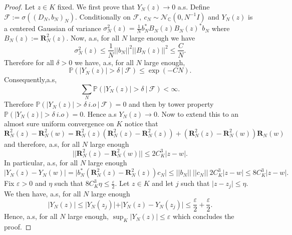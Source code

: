 \documentclass[12pt,a4paper]{amsart}
\theoremstyle{plain} %
\newcommand{\PP}{\mathbb{P}}
\newcommand{\C}{\mathbb{C}}
\begin{document}
\begin{proof}
     Let $z \in K$ fixed. We first prove that $Y_N(z)\rightarrow0$ a.s. Define $\mathcal{F}:=\sigma((D_N,b_N)_N)$. Conditionally on $\mathcal{F}, \ c_N \sim \mathcal{N}_{\C}(0,N^{-1}I)$ and $Y_N(z)$ is a centered Gaussian of variance $\sigma_N^2(z)=\frac{1}{N}b_N^*B_N(z)B_N(z)^*b_N$ where $B_N(z):=\mathbf{R}^2_{N}(z)$. Now, a.s, for all $N$ large enough we have 
     \begin{equation*}
         \sigma_N^2(z)\leq \frac{1}{N}\lvert \lvert b_N\lvert \lvert ^2 \lvert \lvert B_N(z)\lvert \lvert^2\leq \frac{C}{N}.
     \end{equation*}
     Therefore for all $\delta>0$ we have, a.s, for all $N$ large enough, 
     \begin{equation*}
         \PP(\lvert Y_N(z)\lvert> \delta \ \lvert \ \mathcal{F})\leq \exp(-CN). 
     \end{equation*}
     Consequently,a.s,
     \begin{equation*}
         \sum_N \PP(\lvert Y_N(z)\lvert> \delta \ \lvert \ \mathcal{F}) < \infty.
     \end{equation*}
     Therefore $\PP(\lvert Y_N(z)\lvert> \delta  \ \textit{i.o}\ \lvert \ \mathcal{F})=0$  and then by tower property $\PP(\lvert Y_N(z)\lvert> \delta  \ \textit{i.o})=0$. Hence a.s $Y_N(z)\rightarrow0$. Now to extend this to an almost sure uniform convergence on $K$ notice that 
     \begin{equation*}
         \mathbf{R}^2_{N}(z)-\mathbf{R}^2_{N}(w)=\mathbf{R}^2_{N}(z)(\mathbf{R}^2_{N}(z)-\mathbf{R}^2_{N}(z))+(\mathbf{R}^2_{N}(z)-\mathbf{R}^2_{N}(w))\mathbf{R}_{N}(w)
     \end{equation*}
     and therefore, a.s, for all $N$ large enough
     \begin{equation*}
         \lvert \lvert \mathbf{R}^2_{N}(z)-\mathbf{R}^2_{N}(w) \lvert \lvert \leq 2C_K^3\lvert z-w \lvert.
     \end{equation*}
     In particular, a.s, for all $N$ large enough
     \begin{equation*}
         \lvert Y_N(z) -Y_N(w)\lvert =\lvert b_N^*(\mathbf{R}^2_{N}(z)-\mathbf{R}^2_{N}(z))c_N\lvert \leq \lvert \lvert b_N\lvert\lvert \ \lvert \lvert c_N \lvert \lvert  \ 2C_K^3\lvert z-w \lvert \leq 8C_K^3 \lvert z-w \lvert.
     \end{equation*}
     Fix $\varepsilon>0$ and $\eta$ such that $8C_K^3 \eta \leq \frac{\varepsilon}{2}$. Let $z\in K$  and let $j$ such that $\lvert z-z_j\lvert \leq \eta$. We then have, a.s, for all $N$ large enough
     \begin{equation*}
         \lvert Y_N(z) \lvert \leq \lvert Y_N(z_j)\lvert + \lvert Y_N(z)-Y_N(z_j)\lvert\leq \frac{\varepsilon}{2}+ \frac{\varepsilon}{2}.
     \end{equation*}
     Hence, a.s, for all $N$ large enough, $\sup_K \lvert Y_N(z)\lvert \leq \varepsilon$ which concludes the proof.
     \end{proof}
\end{document}
